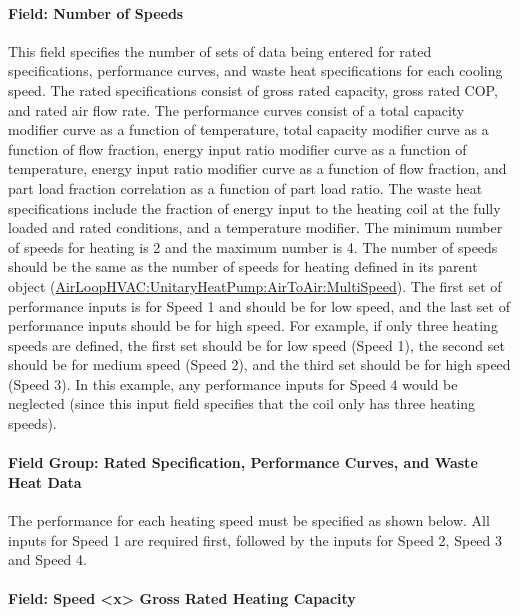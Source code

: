 \paragraph{Field: Number of Speeds}\label{field-number-of-speeds-2}

This field specifies the number of sets of data being entered for rated specifications, performance curves, and waste heat specifications for each cooling speed. The rated specifications consist of gross rated capacity, gross rated COP, and rated air flow rate. The performance curves consist of a total capacity modifier curve as a function of temperature, total capacity modifier curve as a function of flow fraction, energy input ratio modifier curve as a function of temperature, energy input ratio modifier curve as a function of flow fraction, and part load fraction correlation as a function of part load ratio. The waste heat specifications include the fraction of energy input to the heating coil at the fully loaded and rated conditions, and a temperature modifier. The minimum number of speeds for heating is 2 and the maximum number is 4. The number of speeds should be the same as the number of speeds for heating defined in its parent object (\hyperref[airloophvacunitaryheatpumpairtoairmultispeed]{AirLoopHVAC:UnitaryHeatPump:AirToAir:MultiSpeed}). The first set of performance inputs is for Speed 1 and should be for low speed, and the last set of performance inputs should be for high speed. For example, if only three heating speeds are defined, the first set should be for low speed (Speed 1), the second set should be for medium speed (Speed 2), and the third set should be for high speed (Speed 3). In this example, any performance inputs for Speed 4 would be neglected (since this input field specifies that the coil only has three heating speeds).

\paragraph{Field Group: Rated Specification, Performance Curves, and Waste Heat Data}\label{field-group-rated-specification-performance-curves-and-waste-heat-data}

The performance for each heating speed must be specified as shown below. All inputs for Speed 1 are required first, followed by the inputs for Speed 2, Speed 3 and Speed 4.

\paragraph{Field: Speed \textless{}x\textgreater{} Gross Rated Heating Capacity}\label{field-speed-x-gross-rated-heating-capacity}

